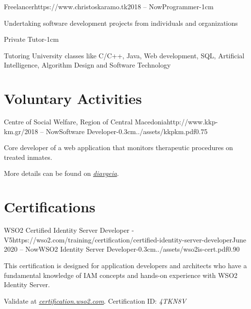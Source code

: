 \documentclass{mycv}
\begin{document}
	\begin{EntryDated}{Freelancer}{https://www.christoskaramo.tk}{2018 -- Now}{Programmer}{-1cm}
	\begin{Itemize}
		\item Undertaking software development projects from individuals and organizations
	\end{Itemize}
	\end{EntryDated}

	\vspace*{-1.2cm}

	\begin{EntryDated}{}{}{}{Private Tutor}{-1cm}
		\begin{Itemize}
			\item Tutoring University classes like C/C++, Java, Web development, SQL, Artificial Intelligence, Algorithm Design and Software Technology
		\end{Itemize}
	\end{EntryDated}
	
	\section{Voluntary Activities}
	\begin{EntryDatedLogo}{Centre of Social Welfare, Region of Central Macedonia}{http://www.kkp-km.gr/}{2018 -- Now}{Software Developer}{-0.3cm}{../assets/kkpkm.pdf}{0.75}
		\begin{Itemize}
			\item Core developer of a web application that monitors therapeutic procedures on treated inmates.
			\item More details can be found on \href{https://diavgeia.gov.gr/decision/view/\%CE\%A8\%CE\%A6\%CE\%A1\%CE\%93\%CE\%9F\%CE\%9E\%CE\%A7\%CE\%A3-\%CE\%A0\%CE\%93\%CE\%A6}{\textit{diavgeia}}.
		\end{Itemize}
	\end{EntryDatedLogo}

	\section{Certifications}
	\begin{EntryDatedLogo}{WSO2 Certified Identity Server
			Developer - V5}{https://wso2.com/training/certification/certified-identity-server-developer}{June 2020 -- Now}{WSO2 Identity Server Developer}{-0.3cm}{../assets/wso2is-cert.pdf}{0.90}
		\begin{Itemize}
			\item This certification is designed for application developers and architects who have a fundamental knowledge of IAM concepts and hands-on experience with WSO2 Identity Server. 
			\item Validate at \href{https://certification.wso2.com}{\textit{certification.wso2.com}}. Certification ID: \textit{4TKN8V}
		\end{Itemize}
	\end{EntryDatedLogo}
\end{document}
